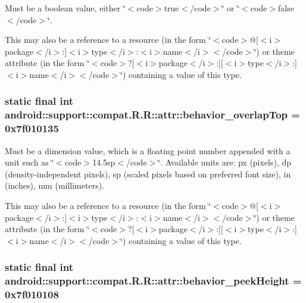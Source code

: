 Must be a boolean value, either \char`\"{}$<$code$>$true$<$/code$>$\char`\"{} or \char`\"{}$<$code$>$false$<$/code$>$\char`\"{}. 

This may also be a reference to a resource (in the form \char`\"{}$<$code$>$@\mbox{[}$<$i$>$package$<$/i$>$:\mbox{]}$<$i$>$type$<$/i$>$:$<$i$>$name$<$/i$>$$<$/code$>$\char`\"{}) or theme attribute (in the form \char`\"{}$<$code$>$?\mbox{[}$<$i$>$package$<$/i$>$:\mbox{]}\mbox{[}$<$i$>$type$<$/i$>$:\mbox{]}$<$i$>$name$<$/i$>$$<$/code$>$\char`\"{}) containing a value of this type. \hypertarget{classandroid_1_1support_1_1compat_1_1_r_1_1attr_c4fcaf7eb6e157ef8f6296f699ca86b8}{
\subsubsection[{behavior\_\-overlapTop}]{\setlength{\rightskip}{0pt plus 5cm}static final int android::support::compat.R.R::attr::behavior\_\-overlapTop = 0x7f010135}}
\label{classandroid_1_1support_1_1compat_1_1_r_1_1attr_c4fcaf7eb6e157ef8f6296f699ca86b8}


Must be a dimension value, which is a floating point number appended with a unit such as \char`\"{}$<$code$>$14.5sp$<$/code$>$\char`\"{}. Available units are: px (pixels), dp (density-independent pixels), sp (scaled pixels based on preferred font size), in (inches), mm (millimeters). 

This may also be a reference to a resource (in the form \char`\"{}$<$code$>$@\mbox{[}$<$i$>$package$<$/i$>$:\mbox{]}$<$i$>$type$<$/i$>$:$<$i$>$name$<$/i$>$$<$/code$>$\char`\"{}) or theme attribute (in the form \char`\"{}$<$code$>$?\mbox{[}$<$i$>$package$<$/i$>$:\mbox{]}\mbox{[}$<$i$>$type$<$/i$>$:\mbox{]}$<$i$>$name$<$/i$>$$<$/code$>$\char`\"{}) containing a value of this type. \hypertarget{classandroid_1_1support_1_1compat_1_1_r_1_1attr_9c9377c2609e9200e33192561204a554}{
\subsubsection[{behavior\_\-peekHeight}]{\setlength{\rightskip}{0pt plus 5cm}static final int android::support::compat.R.R::attr::behavior\_\-peekHeight = 0x7f010108}}
\label{classandroid_1_1support_1_1compat_1_1_r_1_1attr_9c9377c2609e9200e33192561204a554}


